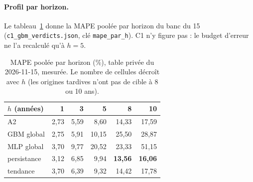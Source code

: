 \paragraph{Profil par horizon.} Le tableau~\ref{met:tab:horizon} donne la MAPE poolée par horizon du banc
du 15 (\texttt{c1\_gbm\_verdicts.json}, clé \texttt{mape\_par\_h}). C1 n'y figure pas : le budget d'erreur
ne l'a recalculé qu'à $h = 5$.

\begin{table}[ht]
\centering\small
\begin{tabular}{@{}lrrrrr@{}}
\toprule
$h$ (années) & 1 & 3 & 5 & 8 & 10 \\
\midrule
A2 & 2,73 & 5,59 & 8,60 & 14,33 & 17,59 \\
GBM global & 2,75 & 5,91 & 10,15 & 25,50 & 28,87 \\
MLP global & 3,70 & 9,77 & 20,52 & 23,33 & 51,15 \\
persistance & 3,12 & 6,85 & 9,94 & \textbf{13,56} & \textbf{16,06} \\
tendance & 3,70 & 6,39 & 9,32 & 14,42 & 17,78 \\
\bottomrule
\end{tabular}
\caption{MAPE poolée par horizon (\%), table privée du 2026-11-15, mesurée\mesure. Le nombre de cellules
décroît avec $h$ (les origines tardives n'ont pas de cible à 8 ou 10 ans).}
\label{met:tab:horizon}
\end{table}

